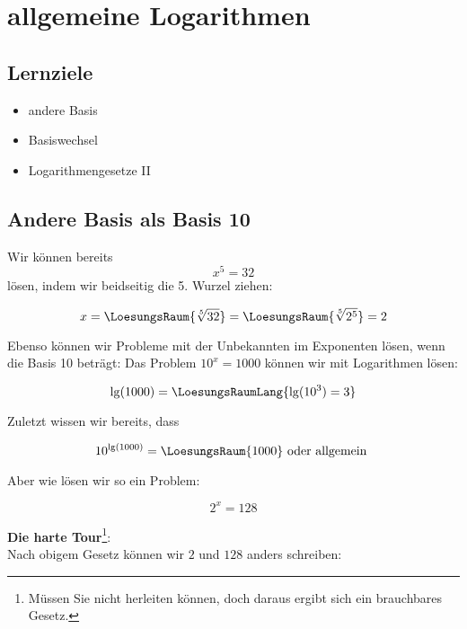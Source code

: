 
\section{allgemeine Logarithmen}
\subsection*{Lernziele}

\begin{itemize}
\item andere Basis
\item Basiswechsel
\item Logarithmengesetze II
\end{itemize}
\newpage

\subsection{Andere Basis als Basis 10}

Wir können bereits $$x^5=32$$ lösen, indem wir beidseitig die
5. Wurzel ziehen:

$$x = \LoesungsRaum{\sqrt[5]{32}} = \LoesungsRaum{\sqrt[5]{2^5}} = 2$$

Ebenso können wir Probleme mit der Unbekannten im Exponenten lösen,
wenn die Basis 10 beträgt: Das Problem $10^x = 1000$ können wir mit
Logarithmen lösen:

$$\lg(1000) = \LoesungsRaumLang{\lg(10^3) = 3}$$

Zuletzt wissen wir bereits, dass

$$10^{\lg(1000)} = \LoesungsRaum{1000} \textrm{ oder allgemein }$$

\begin{center}
\end{center}

\newpage


Aber wie lösen wir so ein Problem:

$$2^x = 128$$

\textbf{Die harte Tour}\label{harteTourLogarithmen}\footnote{Müssen Sie nicht herleiten können,
  doch daraus ergibt sich ein brauchbares Gesetz.}:\\

Nach obigem Gesetz können wir $2$ und $128$ anders schreiben:

